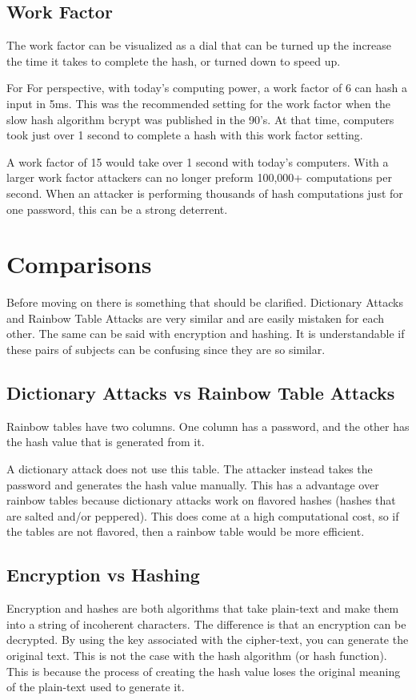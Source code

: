 \documentclass[12pt]{article}
\begin{document}
\subsection{\indent Work Factor}
The work factor can be visualized as a dial that can be turned up the increase the time it takes to complete the hash, or turned down to speed up.

For For perspective, with today’s computing power, a work factor of 6 can hash a input in 5ms. This was the recommended setting for the work factor when the slow hash algorithm bcrypt was published in the 90's. At that time, computers took just over 1 second to complete a hash with this work factor setting. 

A work factor of 15 would take over 1 second with today's computers. With a larger work factor attackers can no longer preform 100,000+ computations per second. When an attacker is performing thousands of hash computations just for one password, this can be a strong deterrent. 

\section{Comparisons}
Before moving on there is something that should be clarified. Dictionary Attacks and Rainbow Table Attacks are very similar and are easily mistaken for each other. The same can be said with encryption and hashing. It is understandable if these pairs of subjects can be confusing since they are so similar. 

\subsection{\indent Dictionary Attacks vs Rainbow Table Attacks}
Rainbow tables have two columns. One column has a password, and the other has the hash value that is generated from it. 

A dictionary attack does not use this table. The attacker instead takes the password and generates the hash value manually. This has a advantage over rainbow tables because dictionary attacks work on flavored hashes (hashes that are salted and/or peppered). This does come at a high computational cost, so if the tables are not flavored, then a rainbow table would be more efficient. 

\subsection{Encryption vs Hashing}
Encryption and hashes are both algorithms that take plain-text and make them into a string of incoherent characters. The difference is that an encryption can be decrypted. By using the key associated with the cipher-text, you can generate the original text. This is not the case with the hash algorithm (or hash function). This is because the process of creating the hash value loses the original meaning of the plain-text used to generate it. 
\end{document}
